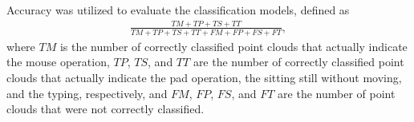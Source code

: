 

Accuracy was utilized to evaluate the classification models, defined as
  \begin{equation}
    \begin{split}
      \frac{TM+TP+TS+TT}{TM+TP+TS+TT+FM+FP+FS+FT}, 
    \end{split}
  \end{equation}
where $TM$ is the number of correctly classified point clouds that actually indicate the mouse operation, $TP$, $TS$, and $TT$ are the number of correctly classified point clouds that actually indicate the pad operation, the sitting still without moving, and the typing, respectively, and $FM$, $FP$, $FS$, and $FT$ are the number of point clouds that were not correctly classified. 

